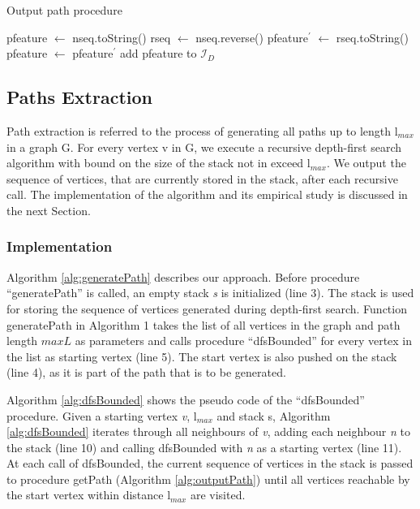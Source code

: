 \documentclass{l4proj}
\newcommand{\fancyI}{\mathcal{I}}
\begin{document}
\begin{algorithm}
\centering
\caption{Output path procedure}
\label{alg:outputPath}
\begin{algorithmic}[1]
\State pfeature $\gets$ nseq.toString() 
\State rseq $\gets$ nseq.reverse() 
\State pfeature$^{\prime}$ $\gets$ rseq.toString() 
\State pfeature $\gets$ pfeature$^{\prime}$ 
\EndIf
\If {pfeature not in $\fancyI_{D}$}
\State add pfeature to $\fancyI_{D}$
\EndIf
\EndProcedure
\end{algorithmic}
\end{algorithm}

\subsection{Paths Extraction}
\label{pi:pathExtr}
Path extraction is referred to the process of generating all paths up to length l$_{max}$ in a graph G. For every vertex v in G, we execute a recursive depth-first search algorithm with bound on the size of the stack not in exceed l$_{max}$. We output the sequence of vertices, that are currently stored in the stack, after each recursive call. The implementation of the algorithm and its empirical study is discussed in the next Section.

\subsubsection{Implementation}
\label{pi:pathExtrImpl}
Algorithm \ref{alg:generatePath} describes our approach. Before procedure ``generatePath'' is called, an empty stack \emph{s} is initialized (line 3). The stack is used for storing the sequence of vertices generated during depth-first search. Function generatePath in \textrm{Algorithm 1} takes the list of all vertices in the graph and path length $maxL$ as parameters and calls procedure ``dfsBounded'' for every vertex in the list as starting vertex (line 5). The start vertex is also pushed on the stack (line 4), as it is part of the path that is to be generated.

Algorithm \ref{alg:dfsBounded} shows the pseudo code of the ``dfsBounded'' procedure. Given a starting vertex \emph{v}, l$_{max}$ and stack s, Algorithm \ref{alg:dfsBounded} iterates through all neighbours of \emph{v}, adding each neighbour \emph{n} to the stack (line 10) and calling dfsBounded with \emph{n} as a starting vertex (line 11). At each call of dfsBounded, the current sequence of vertices in the stack is passed to procedure getPath (Algorithm \ref{alg:outputPath}) until all vertices reachable by the start vertex within distance l$_{max}$ are visited.
\end{document}
